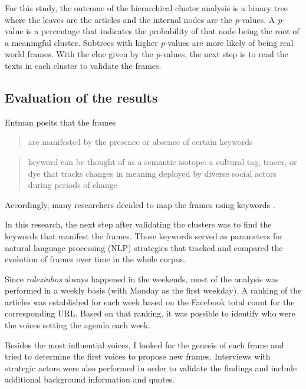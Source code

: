 For this study, the outcome of the hierarchical cluster analysis is a binary tree where the leaves are the articles and the internal nodes are the \emph{p}-values. A \emph{p}-value is a percentage that indicates the probability of that node being the root of a meaningful cluster. Subtrees with higher \emph{p}-values are more likely of being real world frames. With the clue given by the \emph{p}-values, the next step is to read the texts in each cluster to validate the frames.

\subsection{Evaluation of the results}

Entman posits that the frames \blockcquote{entman1993framing}[.]{are manifested by the presence or absence of certain keywords} \blockcquote{ghaziani2005keywords}[.]{ keyword can be thought of as a semantic isotope: a cultural tag, tracer, or dye that tracks changes in meaning deployed by diverse social actors during periods of change} Accordingly, many researchers decided to map the frames using keywords \cite{Miller01121997, miller1998framing, Fiss01022005}.

In this research, the next step after validating the clusters was to find the keywords that manifest the frames. Those keywords served as parameters for natural language processing (NLP) strategies that tracked and compared the evolution of frames over time in the whole corpus.

Since \emph{rolezinhos} always happened in the weekends, most of the analysis was performed in a weekly basis (with Monday as the first weekday). A ranking of the articles was established for each week based on the Facebook total count for the corresponding URL. Based on that ranking, it was possible to identify who were the voices setting the agenda each week.

Besides the most influential voices, I looked for the genesis of each frame and tried to determine the first voices to propose new frames. Interviews with strategic actors were also performed in order to validate the findings and include additional background information and quotes.